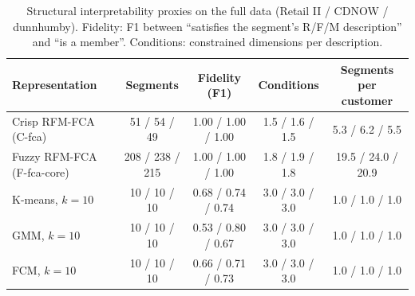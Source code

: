 \begin{table}[t]
\centering\small
\caption{Structural interpretability proxies on the full data (Retail II / CDNOW / dunnhumby). Fidelity: F1 between ``satisfies the segment's R/F/M description'' and ``is a member''. Conditions: constrained dimensions per description.}
\label{tab:interpretability}
\begin{tabular}{lcccc}
\toprule
Representation & Segments & Fidelity (F1) & Conditions & Segments per customer \\
\midrule
Crisp RFM-FCA (C-fca) & 51 / 54 / 49 & 1.00 / 1.00 / 1.00 & 1.5 / 1.6 / 1.5 & 5.3 / 6.2 / 5.5 \\
Fuzzy RFM-FCA (F-fca-core) & 208 / 238 / 215 & 1.00 / 1.00 / 1.00 & 1.8 / 1.9 / 1.8 & 19.5 / 24.0 / 20.9 \\
K-means, $k{=}10$ & 10 / 10 / 10 & 0.68 / 0.74 / 0.74 & 3.0 / 3.0 / 3.0 & 1.0 / 1.0 / 1.0 \\
GMM, $k{=}10$ & 10 / 10 / 10 & 0.53 / 0.80 / 0.67 & 3.0 / 3.0 / 3.0 & 1.0 / 1.0 / 1.0 \\
FCM, $k{=}10$ & 10 / 10 / 10 & 0.66 / 0.71 / 0.73 & 3.0 / 3.0 / 3.0 & 1.0 / 1.0 / 1.0 \\
\bottomrule
\end{tabular}
\end{table}
